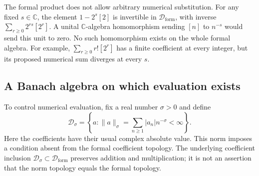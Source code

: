 The formal product does not allow arbitrary numerical substitution.
For any fixed $s\in\mathbb C$, the element
$1-2^s[2]$ is invertible in $\mathscr D_{\mathrm{form}}$, with
inverse $\sum_{r\geq0}2^{rs}[2^r]$.
A unital $\mathbb C$-algebra homomorphism sending $[n]$ to $n^{-s}$
would send this unit to zero. No such homomorphism exists on the
whole formal algebra. For example,
$\sum_{r\geq0}r![2^r]$ has a finite coefficient at every integer,
but its proposed numerical sum diverges at every $s$.

\subsection{A Banach algebra on which evaluation exists}
\label{sec:da-banach}

To control numerical evaluation, fix a real number $\sigma>0$ and
define
\[
 \mathscr D_\sigma=
 \left\{a:\|a\|_\sigma=
                 \sum_{n\geq1}|a_n|n^{-\sigma}<\infty\right\}.
\]
Here the coefficients have their usual complex absolute value.
This norm imposes a condition absent from the formal coefficient
topology. The underlying coefficient inclusion
$\mathscr D_\sigma\subset\mathscr D_{\mathrm{form}}$ preserves
addition and multiplication; it is not an assertion that the norm
topology equals the formal topology.

